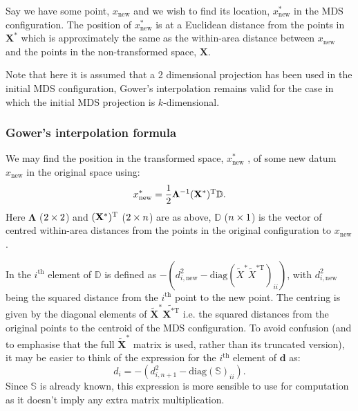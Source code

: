 Say we have some point, $x_{\text{new}}$ and we wish to find its location, $x^*_{\text{new}}$ in the MDS configuration. The position of $x^*_{\text{new}}$ is at a Euclidean distance from the points in $\mathbf{X}^*$ which is approximately the same as the within-area distance between $x_{\text{new}}$ and the points in the non-transformed space, $\mathbf{X}$. 

Note that here it is assumed that a 2 dimensional projection has been used in the initial MDS configuration, Gower's interpolation remains valid for the case in which the initial MDS projection is $k$-dimensional.

\subsubsection{Gower's interpolation formula}

We may find the position in the transformed space, $x^*_{\text{new}}$ , of some new datum $x_{\text{new}}$ in the original space using:
\begin{equation}
x^*_{\text{new}} = \frac{1}{2} \mathbf{\Lambda}^{-1} (\mathbf{X}^*)^{\text{T}} \mathbb{D}.
\label{gower}
\end{equation}
Here $\mathbf{\Lambda}$ ($2 \times 2$) and $(\mathbf{X}^*)^{\text{T}}$ ($2 \times n$) are as above, $\mathbb{D}$ ($n \times 1$) is the vector of centred within-area distances from the points in the original configuration to $x_{\text{new}}$.

In  the $i^\text{th}$ element of $\mathbb{D}$ is defined as $-(d^2_{i,\text{new}}-\text{diag}(\tilde{X}^* \tilde{X}^{*\text{T}})_{ii})$, with $d^2_{i,\text{new}}$ being the squared distance from the $i^\text{th}$ point to the new point. The centring is given by the diagonal elements of $\tilde{\mathbf{X}}^*\tilde{\mathbf{X}^{* \text{T}}}$ i.e. the squared distances from the original points to the centroid of the MDS configuration. To avoid confusion (and to emphasise that the full $\tilde{\mathbf{X}}^*$ matrix is used, rather than its truncated version), it may be easier to think of the expression for the $i^\text{th}$ element of $\bm{d}$ as:
\begin{equation}
d_{i} = -(d^2_{i,n+1}-\text{diag}(\mathbb{S})_{ii}).
\end{equation}
Since $\mathbb{S}$ is already known, this expression is more sensible to use for computation as it doesn't imply any extra matrix multiplication.

